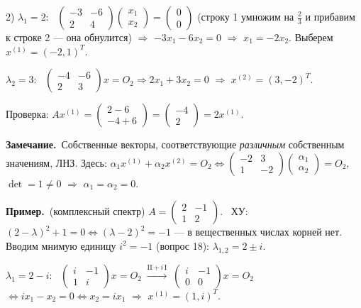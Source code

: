 \documentclass[a4paper,11pt]{article}
\newcommand{\gauss}[1]{\;\xrightarrow{\scriptstyle #1}\;}
\newcommand{\prim}{\par\smallskip\noindent\textbf{\textcolor{teoc!80!black}{Пример.}}\ }
\newcommand{\zam}{\par\smallskip\noindent\textbf{\textcolor{zamc}{Замечание.}}\ }
\begin{document}
2) $\lambda_1 = 2$: \ $\begin{pmatrix} -3 & -6 \\ 2 & 4 \end{pmatrix}\begin{pmatrix} x_1 \\ x_2 \end{pmatrix} = \begin{pmatrix} 0 \\ 0 \end{pmatrix}$
(строку 1 умножим на $\frac23$ и прибавим к строке 2 --- она обнулится) $\Rightarrow$ $-3x_1 - 6x_2 = 0$ $\Rightarrow$ $x_1 = -2x_2$.
Выберем $x^{(1)} = (-2, 1)^T$.

$\lambda_2 = 3$: \ $\begin{pmatrix} -4 & -6 \\ 2 & 3 \end{pmatrix} x = O_2 \Rightarrow 2x_1 + 3x_2 = 0$ $\Rightarrow$ $x^{(2)} = (3, -2)^T$.

Проверка: $A x^{(1)} = \begin{pmatrix} 2 - 6 \\ -4 + 6 \end{pmatrix} = \begin{pmatrix} -4 \\ 2 \end{pmatrix} = 2 x^{(1)}$. \checkmark

\zam Собственные векторы, соответствующие \emph{различным} собственным значениям, ЛНЗ. Здесь:
$\alpha_1 x^{(1)} + \alpha_2 x^{(2)} = O_2 \Leftrightarrow \begin{pmatrix} -2 & 3 \\ 1 & -2 \end{pmatrix}\begin{pmatrix} \alpha_1 \\ \alpha_2 \end{pmatrix} = O_2$,
$\det = 1 \ne 0$ $\Rightarrow$ $\alpha_1 = \alpha_2 = 0$.

\prim (комплексный спектр) $A = \begin{pmatrix} 2 & -1 \\ 1 & 2 \end{pmatrix}$. \
ХУ: $(2 - \lambda)^2 + 1 = 0 \Leftrightarrow (\lambda - 2)^2 = -1$ --- в вещественных числах корней нет.
Вводим мнимую единицу $i^2 = -1$ (вопрос 18): $\lambda_{1,2} = 2 \pm i$.

$\lambda_1 = 2 - i$: \ $\begin{pmatrix} i & -1 \\ 1 & i \end{pmatrix} x = O_2 \gauss{\text{II} + i\,\text{I}} \begin{pmatrix} i & -1 \\ 0 & 0 \end{pmatrix} x = O_2$
$\Leftrightarrow ix_1 - x_2 = 0 \Leftrightarrow x_2 = ix_1$ $\Rightarrow$ $x^{(1)} = (1, i)^T$.
\end{document}
